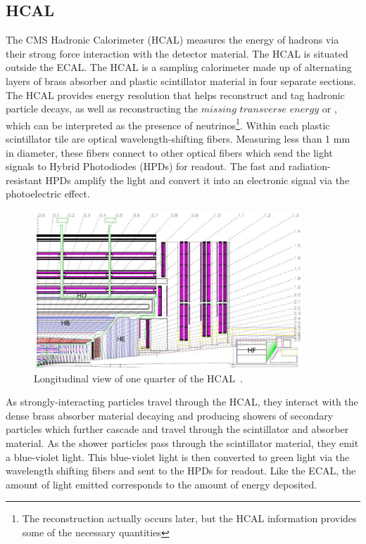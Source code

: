 \subsection{HCAL}
The CMS Hadronic Calorimeter (HCAL) measures the energy of hadrons via their strong force interaction with the detector material. The HCAL is situated outside the ECAL.
The HCAL is a sampling calorimeter made up of alternating layers of brass absorber and plastic scintillator material in four separate sections. The HCAL provides energy resolution that helps reconstruct and tag hadronic
particle decays, as well as reconstructing the $missing$ $transverse$ $energy$ or \met, which can be interpreted as the presence of neutrinos\footnote{The \met reconstruction actually occurs later, but the HCAL information
provides some of the necessary quantities}. Within each plastic scintillator tile are optical wavelength-shifting fibers.
Measuring less than 1 mm in diameter, these fibers connect to other optical fibers which send the light signals to Hybrid Photodiodes (HPDs) for readout. The fast and radiation-resistant HPDs amplify the light and convert it
into an electronic signal via the photoelectric effect.

\begin{figure}[hbtp]
 \begin{center}
   \includegraphics[width=0.9\textwidth]{ch3_figs/hcal.pdf}
   \caption[Longitudinal view of the CMS HCAL]{Longitudinal view of one quarter of the HCAL~\cite{cms_bluebook}.}
   \label{fig:cms_hcal}
 \end{center}
\end{figure}

As strongly-interacting particles travel through the HCAL, they interact with the dense brass absorber material decaying and producing showers of secondary particles which further cascade and travel through the scintillator and absorber material.
As the shower particles pass through the scintillator material, they emit a blue-violet light. This blue-violet light is then converted to green light via the wavelength shifting fibers and sent to the HPDs for readout. Like the ECAL,
the amount of light emitted corresponds to the amount of energy deposited. 

